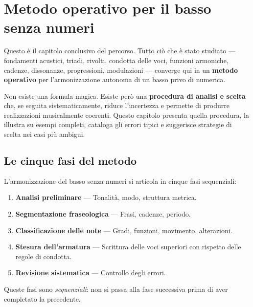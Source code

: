\chapter{Metodo operativo per il basso senza numeri}
\label{chap:metodo_basso_senza_numeri}

Questo è il capitolo conclusivo del percorso. Tutto ciò che è stato studiato --- fondamenti acustici, triadi, rivolti, condotta delle voci, funzioni armoniche, cadenze, dissonanze, progressioni, modulazioni --- converge qui in un \textbf{metodo operativo} per l'armonizzazione autonoma di un basso privo di numerica.

Non esiste una formula magica. Esiste però una \textbf{procedura di analisi e scelta} che, se seguita sistematicamente, riduce l'incertezza e permette di produrre realizzazioni musicalmente coerenti. Questo capitolo presenta quella procedura, la illustra su esempi completi, cataloga gli errori tipici e suggerisce strategie di scelta nei casi più ambigui.

\section{Le cinque fasi del metodo}
\label{sec:cinque_fasi}

\begin{regola}
	\label{reg:metodo_cinque_fasi}
	L'armonizzazione del basso senza numeri si articola in cinque fasi sequenziali:
	\begin{enumerate}
		\item \textbf{Analisi preliminare} --- Tonalità, modo, struttura metrica.
		\item \textbf{Segmentazione fraseologica} --- Frasi, cadenze, periodo.
		\item \textbf{Classificazione delle note} --- Gradi, funzioni, movimento, alterazioni.
		\item \textbf{Stesura dell'armatura} --- Scrittura delle voci superiori con rispetto delle regole di condotta.
		\item \textbf{Revisione sistematica} --- Controllo degli errori.
	\end{enumerate}
	Queste fasi sono \textit{sequenziali}: non si passa alla fase successiva prima di aver completato la precedente.
\end{regola}

